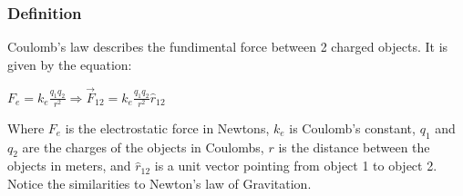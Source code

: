 \subsubsection*{Definition}
\hspace{.5cm}
Coulomb's law describes the fundimental force between 2 charged objects. It is given by the equation:

\begin{center}
    $F_e = k_e \frac{q_1q_2}{r^2} \Longrightarrow \vec{F}_{12} = k_e \frac{q_1q_2}{r^2}\hat{r}_{12}$
\end{center}

\hspace{.5cm}
Where $F_e$ is the electrostatic force in Newtons, $k_e$ is Coulomb's constant, $q_1$ and $q_2$ are the charges of the objects in Coulombs,
$r$ is the distance between the objects in meters, and $\hat{r}_{12}$ is a unit vector pointing from object 1 to object 2.
Notice the similarities to Newton's law of Gravitation.\\

